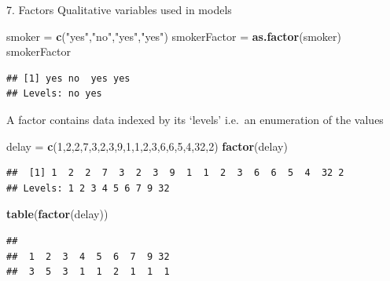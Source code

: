 \documentclass[
  ignorenonframetext,
]{beamer}
\newenvironment{Shaded}{\begin{snugshade}}{\end{snugshade}}
\newcommand{\DecValTok}[1]{\textcolor[rgb]{0.00,0.00,0.81}{#1}}
\newcommand{\FunctionTok}[1]{\textcolor[rgb]{0.13,0.29,0.53}{\textbf{#1}}}
\newcommand{\NormalTok}[1]{#1}
\newcommand{\OtherTok}[1]{\textcolor[rgb]{0.56,0.35,0.01}{#1}}
\newcommand{\StringTok}[1]{\textcolor[rgb]{0.31,0.60,0.02}{#1}}
\begin{document}
\begin{frame}[fragile]{7. Factors}
\protect\hypertarget{factors}{}
Qualitative variables used in models

\begin{Shaded}
\begin{Highlighting}[]
\NormalTok{smoker }\OtherTok{=} \FunctionTok{c}\NormalTok{(}\StringTok{"yes"}\NormalTok{,}\StringTok{"no"}\NormalTok{,}\StringTok{"yes"}\NormalTok{,}\StringTok{"yes"}\NormalTok{)}
\NormalTok{smokerFactor }\OtherTok{=} \FunctionTok{as.factor}\NormalTok{(smoker)}
\NormalTok{smokerFactor}
\end{Highlighting}
\end{Shaded}

\begin{verbatim}
## [1] yes no  yes yes
## Levels: no yes
\end{verbatim}

A factor contains data indexed by its `levels' i.e.~an enumeration of
the values

\begin{Shaded}
\begin{Highlighting}[]
\NormalTok{delay }\OtherTok{=} \FunctionTok{c}\NormalTok{(}\DecValTok{1}\NormalTok{,}\DecValTok{2}\NormalTok{,}\DecValTok{2}\NormalTok{,}\DecValTok{7}\NormalTok{,}\DecValTok{3}\NormalTok{,}\DecValTok{2}\NormalTok{,}\DecValTok{3}\NormalTok{,}\DecValTok{9}\NormalTok{,}\DecValTok{1}\NormalTok{,}\DecValTok{1}\NormalTok{,}\DecValTok{2}\NormalTok{,}\DecValTok{3}\NormalTok{,}\DecValTok{6}\NormalTok{,}\DecValTok{6}\NormalTok{,}\DecValTok{5}\NormalTok{,}\DecValTok{4}\NormalTok{,}\DecValTok{32}\NormalTok{,}\DecValTok{2}\NormalTok{)}
\FunctionTok{factor}\NormalTok{(delay)}
\end{Highlighting}
\end{Shaded}

\begin{verbatim}
##  [1] 1  2  2  7  3  2  3  9  1  1  2  3  6  6  5  4  32 2 
## Levels: 1 2 3 4 5 6 7 9 32
\end{verbatim}

\begin{Shaded}
\begin{Highlighting}[]
\FunctionTok{table}\NormalTok{(}\FunctionTok{factor}\NormalTok{(delay))}
\end{Highlighting}
\end{Shaded}

\begin{verbatim}
## 
##  1  2  3  4  5  6  7  9 32 
##  3  5  3  1  1  2  1  1  1
\end{verbatim}
\end{frame}
\end{document}
